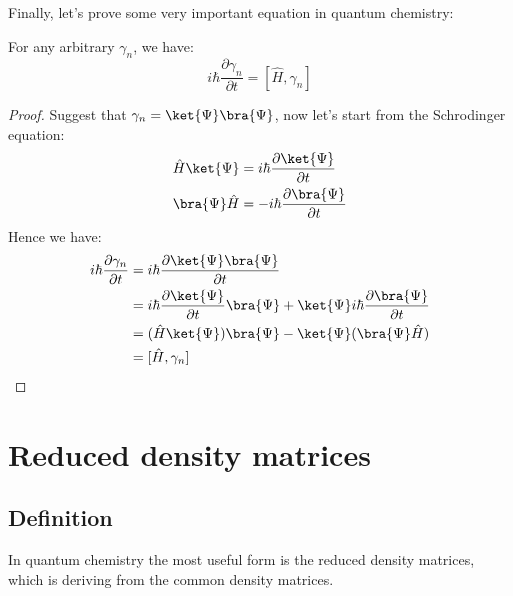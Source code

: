 Finally, let's prove some very important equation in quantum
chemistry:
\begin{theorem}\label{DM:3}
For any arbitrary  $\gamma_{n}$, we have:
\begin{equation}\label{}
i \hbar\frac{\partial \gamma_{n}}{\partial t} = [\hat{H},
\gamma_{n}]
\end{equation}
\end{theorem}

\begin{proof}
Suggest that $\gamma_{n} = \ket{\Psi}\bra{\Psi}$, now let's start
from the Schrodinger equation:
\begin{align}\label{}
\hat{H}\ket{\Psi} &= i \hbar \frac{\partial \ket{\Psi}}{\partial t}
\nonumber \\
\bra{\Psi}\hat{H} &= -i \hbar \frac{\partial \bra{\Psi}}{\partial t}
\end{align}
Hence we have:
\begin{equation}\label{}
\begin{split}
  i \hbar\frac{\partial \gamma_{n}}{\partial t} &=
   i \hbar \frac{\partial \ket{\Psi}\bra{\Psi}}{\partial t}\\
    &=
    i \hbar \frac{\partial \ket{\Psi}}{\partial t}\bra{\Psi} +
    \ket{\Psi}i \hbar \frac{\partial \bra{\Psi}}{\partial t} \\
    &= (\hat{H}\ket{\Psi})\bra{\Psi} - \ket{\Psi}(\bra{\Psi}\hat{H})
    \\
    &= [\hat{H}, \gamma_{n}]
\end{split}
\end{equation}
 \qedhere
\end{proof}

\section{Reduced density matrices}
%
%

\subsection{Definition}
%
%
In quantum chemistry the most useful form is the reduced density
matrices, which is deriving from the common density matrices.

